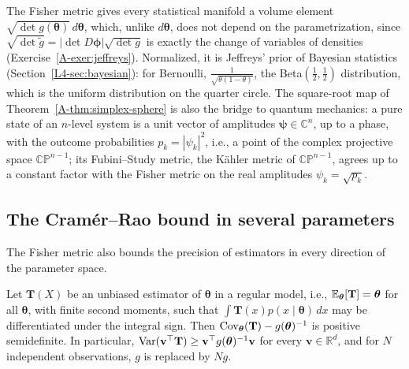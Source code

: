 \begin{remark}
    The Fisher metric gives every statistical manifold a volume element $\sqrt{\det g(\boldsymbol{\theta})}\, d\boldsymbol{\theta}$, which, unlike $d\boldsymbol{\theta}$, does not depend on the parametrization, since $\sqrt{\det\tilde g} = |\det D\boldsymbol{\phi}|\sqrt{\det g}$ is exactly the change of variables of densities (Exercise~\ref{A-exer:jeffreys}). Normalized, it is Jeffreys' prior of Bayesian statistics (Section~\ref{L4-sec:bayesian}): for Bernoulli, $\frac{1}{\sqrt{\theta(1 - \theta)}}$, the Beta$(\frac{1}{2}, \frac{1}{2})$ distribution, which is the uniform distribution on the quarter circle. The square-root map of Theorem~\ref{A-thm:simplex-sphere} is also the bridge to quantum mechanics: a pure state of an $n$-level system is a unit vector of amplitudes $\boldsymbol{\psi} \in \mathbb{C}^n$, up to a phase, with the outcome probabilities $p_k = |\psi_k|^2$, i.e., a point of the complex projective space $\mathbb{CP}^{n-1}$; its Fubini--Study metric, the K\"ahler metric of $\mathbb{CP}^{n-1}$, agrees up to a constant factor with the Fisher metric on the real amplitudes $\psi_k = \sqrt{p_k}$.
\end{remark}

\subsection{The Cram\'er--Rao bound in several parameters}

The Fisher metric also bounds the precision of estimators in every direction of the parameter space.

\begin{theorem}\label{A-thm:cramer-rao-multi}
    Let $\mathbf{T}(X)$ be an unbiased estimator of $\boldsymbol{\theta}$ in a regular model, i.e., $\mathbb{E}_{\boldsymbol{\theta}}[\mathbf{T}] = \boldsymbol{\theta}$ for all $\boldsymbol{\theta}$, with finite second moments, such that $\int \mathbf{T}(x)p(x \mid \boldsymbol{\theta})\, dx$ may be differentiated under the integral sign. Then $\operatorname{Cov}_{\boldsymbol{\theta}}(\mathbf{T}) - g(\boldsymbol{\theta})^{-1}$ is positive semidefinite. In particular, $\operatorname{Var}(\mathbf{v}^\top\mathbf{T}) \geq \mathbf{v}^\top g(\boldsymbol{\theta})^{-1}\mathbf{v}$ for every $\mathbf{v} \in \mathbb{R}^d$, and for $N$ independent observations, $g$ is replaced by $Ng$.
\end{theorem}


